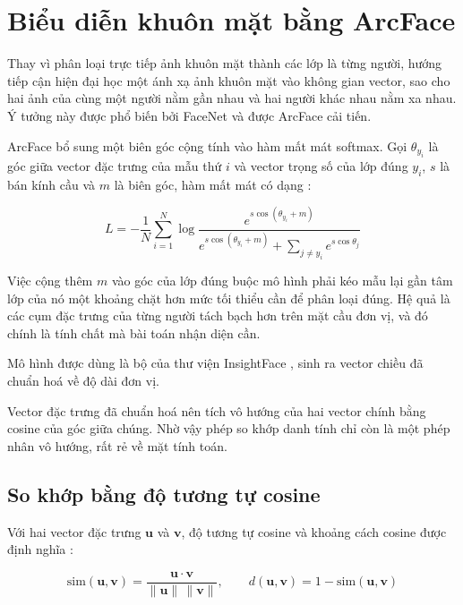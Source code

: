 \section{Biểu diễn khuôn mặt bằng ArcFace}
\label{sec:arcface}

Thay vì phân loại trực tiếp ảnh khuôn mặt thành các lớp là từng người, hướng
tiếp cận hiện đại học một   ánh xạ ảnh khuôn
mặt vào không gian vector, sao cho hai ảnh của cùng một người nằm gần nhau và
hai người khác nhau nằm xa nhau. Ý tưởng này được phổ biến bởi FaceNet
\cite{Schroff2015FaceNet} và được ArcFace \cite{Deng2019ArcFace} cải tiến.

ArcFace bổ sung một biên góc cộng tính vào hàm mất mát softmax. Gọi
$\theta_{y_i}$ là góc giữa vector đặc trưng của mẫu thứ $i$ và vector trọng
số của lớp đúng $y_i$, $s$ là bán kính cầu và $m$ là biên góc, hàm mất mát
có dạng \cite{Deng2019ArcFace}:

\begin{equation}
\label{eq:arcface}
L = -\frac{1}{N}\sum_{i=1}^{N}
\log \frac{e^{s\cos(\theta_{y_i}+m)}}
{e^{s\cos(\theta_{y_i}+m)} + \sum_{j \neq y_i} e^{s\cos\theta_j}}
\end{equation}

Việc cộng thêm $m$ vào góc của lớp đúng buộc mô hình phải kéo mẫu lại gần
tâm lớp của nó một khoảng chặt hơn mức tối thiểu cần để phân loại đúng. Hệ
quả là các cụm đặc trưng của từng người tách bạch hơn trên mặt cầu đơn vị, và
đó chính là tính chất mà bài toán nhận diện cần.

Mô hình được dùng là bộ  của thư viện InsightFace
\cite{InsightFace2023}, sinh ra vector \FchieuVector{} chiều đã chuẩn hoá về
độ dài đơn vị.

\begin{ghinho}
Vector đặc trưng đã chuẩn hoá nên tích vô hướng của hai vector chính bằng
cosine của góc giữa chúng. Nhờ vậy phép so khớp danh tính chỉ còn là một
phép nhân vô hướng, rất rẻ về mặt tính toán.
\end{ghinho}

\subsection{So khớp bằng độ tương tự cosine}
\label{sec:sokhop}

Với hai vector đặc trưng $\mathbf{u}$ và $\mathbf{v}$, độ tương tự cosine và
khoảng cách cosine được định nghĩa \cite{Manning2008IR}:

\begin{equation}
\label{eq:cosine}
\mathrm{sim}(\mathbf{u}, \mathbf{v}) =
\frac{\mathbf{u} \cdot \mathbf{v}}{\lVert \mathbf{u}\rVert \, \lVert \mathbf{v}\rVert},
\qquad
d(\mathbf{u}, \mathbf{v}) = 1 - \mathrm{sim}(\mathbf{u}, \mathbf{v})
\end{equation}

